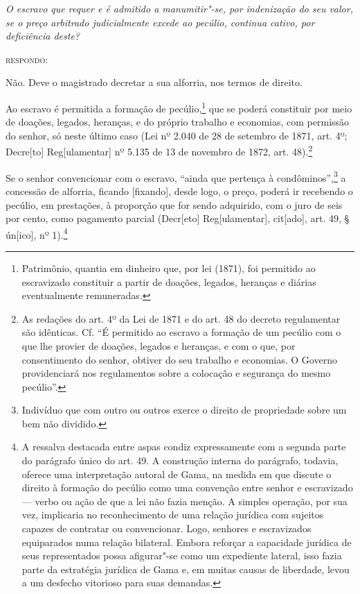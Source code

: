 \emph{O escravo que requer e é admitido a
manumitir"-se, por indenização do seu valor, se o preço arbitrado
judicialmente excede ao pecúlio, continua cativo, por deficiência
deste?}

\textsc{respondo:}

Não. Deve o magistrado decretar a sua alforria, nos termos de direito.

\asterisc

Ao escravo é permitida a formação de pecúlio,\footnote{Patrimônio,
  quantia em dinheiro que, por lei (1871), foi permitido ao escravizado
  constituir a partir de doações, legados, heranças e diárias
  eventualmente remuneradas.} que se poderá constituir por meio de
doações, legados, heranças, e do próprio trabalho e economias, com
permissão do senhor, só neste último caso (Lei nº 2.040 de 28 de
setembro de 1871, art. 4º; Decre{[}to{]} Reg{[}ulamentar{]} nº 5.135 de
13 de novembro de 1872, art. 48).\footnote{As redações do art. 4º da
  Lei de 1871 e do art. 48 do decreto regulamentar são idênticas. Cf. ``É
  permitido ao escravo a formação de um pecúlio com o que lhe provier de
  doações, legados e heranças, e com o que, por consentimento do senhor,
  obtiver do seu trabalho e economias. O Governo providenciará nos
  regulamentos sobre a colocação e segurança do mesmo pecúlio''.}

Se o senhor convencionar com o escravo, ``ainda que pertença à
condôminos'',\footnote{Indivíduo que com outro ou outros exerce o
  direito de propriedade sobre um bem não dividido.} a concessão de
alforria, ficando {[}fixando{]}, desde logo, o preço, poderá ir
recebendo o pecúlio, em prestações, à proporção que for sendo adquirido,
com o juro de seis por cento, como pagamento parcial (Decr{[}eto{]}
Reg{[}ulamentar{]}, cit{[}ado{]}, art. 49, § ún{[}ico{]}, nº
1).\footnote{A ressalva destacada entre aspas condiz expressamente com
  a segunda parte do parágrafo único do art. 49. A construção interna do
  parágrafo, todavia, oferece uma interpretação autoral de Gama,
  na medida em que discute o direito à formação do pecúlio como uma
  convenção entre senhor e escravizado --- verbo ou ação de que a lei não
  fazia menção. A simples operação, por sua vez, implicaria no
  reconhecimento de uma relação jurídica com sujeitos capazes de
  contratar ou convencionar. Logo, senhores e escravizados equiparados
  numa relação bilateral. Embora reforçar a capacidade jurídica de seus
  representados possa afigurar"-se como um expediente lateral, isso fazia
  parte da estratégia jurídica de Gama e, em muitas causas de liberdade,
  levou a um desfecho vitorioso para suas demandas.}

